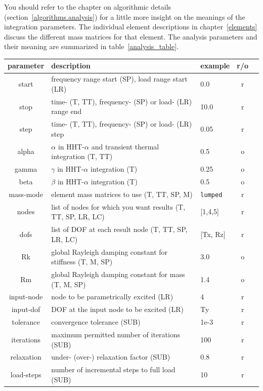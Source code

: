 You should refer to the chapter
on algorithmic details (section~\ref{algorithms.analysis}) for a little more 
insight on the meanings of the
integration parameters.  The individual element descriptions in 
chapter~\ref{elements} discuss the different mass matrices for that element.
The analysis parameters and their meaning are summarized in 
table~\ref{analysis_table}.
\begin{table}
 \begin{center}
\small{
  \begin{tabular}{|c|l|l|c|c|}
\hline
parameter & description	& example & r/o \\
\hline\hline
start     & frequency range start (SP), load range start (LR) & 0.0 & r \\
stop      & time- (T, TT), frequency- (SP) or load- (LR) range end & 10.0 & r \\
step      & time- (T, TT), frequency- (SP) or load- (LR) step & 0.05 & r \\
alpha	  & $\alpha$ in HHT-$\alpha$ and transient thermal integration (T, TT) & 0.5 & o \\
gamma	  & $\gamma$ in HHT-$\alpha$ integration (T) & 0.25 & o \\
beta	  & $\beta$ in HHT-$\alpha$ integration (T) & 0.5 & o \\
mass-mode & element mass matrices to use (T, TT, SP, M) & {\tt lumped} & r \\
nodes     & list of nodes for which you want results (T, TT, SP, LR, LC) & [1,4,5] & r \\
dofs	  & list of DOF at each result node (T, TT, SP, LR, LC) & [Tx, Rz] & r \\
Rk	  & global Rayleigh damping constant for stiffness (T, M, SP) & 3.0 & o \\
Rm	  & global Rayleigh damping constant for mass (T, M, SP) & 1.4 & o \\
input-node & node to be parametrically excited (LR)         & 4     & r \\
input-dof  & DOF at the input node to be excited (LR)       & Ty    & r \\
tolerance  & convergence tolerance (SUB)	              & 1e-3  & r \\
iterations & maximum permitted number of iterations (SUB)   & 100   & r \\
relaxation & under- (over-) relaxation factor (SUB)         & 0.8   & r \\
load-steps & number of incremental steps to full load (SUB) & 10    & r \\

\end{tabular}}
\end{center}
\end{table}

